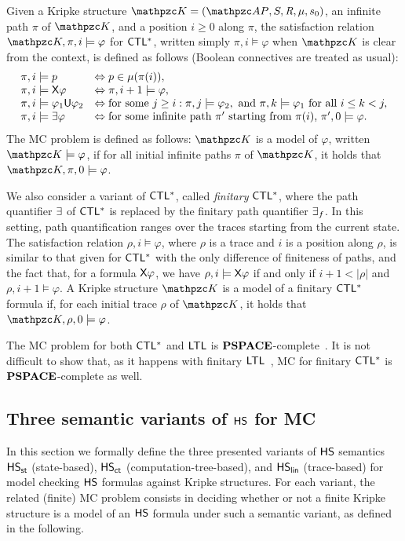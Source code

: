 Given a Kripke
structure $\Ku=\KuDef$, an infinite path $\pi$ of
$\Ku$, and a position $i\geq 0$ along $\pi$, the
satisfaction relation $\Ku,\pi,i \models \varphi$ for
$\text{\sffamily CTL$^{*}$}$, written simply $\pi,i \models \varphi$ when $\Ku$ is clear from the context, is defined as follows (Boolean connectives are treated as usual):%
\[ \begin{array}{ll}
\pi, i \models p  &  \Leftrightarrow  p \in \mu(\pi(i)),\\
\pi, i \models \textsf{X} \varphi  & \Leftrightarrow   \pi, i+1 \models \varphi ,\\
\pi, i \models \varphi_1\textsf{U} \varphi_2  &
  \Leftrightarrow  \text{for some $j\geq i$}: \pi, j
  \models \varphi_2,
  \text{ and }  \pi, k \models  \varphi_1 \text{ for all }i\leq k<j,\\
\pi, i \models \exists \varphi  & \Leftrightarrow \text{for some infinite path } \pi'  \text{ starting from $\pi(i)$, }  \pi', 0 \models \varphi .
\end{array} \]
%
The MC problem is defined as follows: $\Ku$ is a model of $\varphi$, written $\Ku\models \varphi$, if for all initial infinite paths $\pi$ of $\Ku$, it holds that $\Ku,\pi, 0 \models\varphi$.

We also consider a variant of $\text{\sffamily CTL$^{*}$}$, called \emph{finitary} $\text{\sffamily CTL$^{*}$}$, where the path quantifier $\exists$ of $\text{\sffamily CTL$^{*}$}$ is replaced by the finitary path
quantifier $\exists_f$. In this setting, path quantification ranges over the traces starting from the current state.
The satisfaction relation $\rho, i \models \varphi$, where $\rho$ is a trace and $i$ is a position along $\rho$, is similar to that given for $\text{\sffamily CTL$^{*}$}$ with the only difference of finiteness of paths, and the fact that, for a formula $\textsf{X}\varphi$, we have  $\rho, i \models \textsf{X}\varphi$ if and only if $i+1<|\rho|$ and $\rho, i+1 \models \varphi$.    A Kripke structure $\Ku$  is a model of a finitary $\text{\sffamily CTL$^{*}$}$ formula if, for each initial trace $\rho$ of  $\Ku$,  it holds that $\Ku,\rho, 0 \models\varphi$.
  
The MC problem for both $\text{\sffamily CTL$^{*}$}$ and $\text{\sffamily LTL}$ is $\textbf{PSPACE}$-complete~\cite{DBLP:conf/popl/EmersonL85,Sistla:1985}. It is not difficult to show that, as it happens with finitary $\text{\sffamily LTL}$~\cite{DBLP:conf/ijcai/GiacomoV13}, MC for finitary $\text{\sffamily CTL$^{*}$}$ is $\textbf{PSPACE}$-complete as well.


\subsection{Three semantic variants of $\text{\sffamily HS}$ for MC}\label{sect:3sem}%
In this section we formally define the three presented variants of $\text{\sffamily HS}$ semantics $\text{\sffamily HS}_{\mathsf{st}}$ (state-based), $\text{\sffamily HS}_{\mathsf{ct}}$ (computation-tree-based), and $\text{\sffamily HS}_{\mathsf{lin}}$ (trace-based) for model checking $\text{\sffamily HS}$ formulas against Kripke structures.
For each variant, the related (finite) MC problem consists in deciding whether or not a finite Kripke structure is a model of an $\text{\sffamily HS}$ formula under such a semantic variant, as defined in the following.

